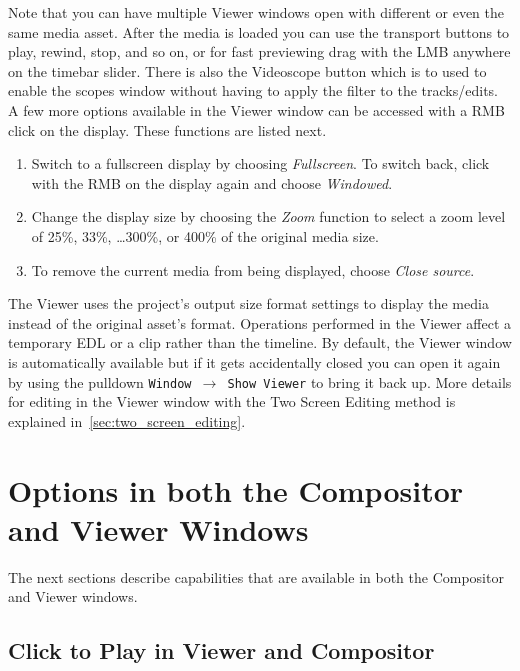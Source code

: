 Note that you can have multiple Viewer windows open with different or even the same media asset.
After the media is loaded you can use the transport buttons to play, rewind, stop, and so on, or
for fast previewing drag with the LMB anywhere on the timebar slider.  There is also the Videoscope
button which is to used to enable the scopes window without having to apply the filter to the tracks/edits.
A few more options available in the Viewer window can be accessed with a RMB click on the display.
These functions are listed next.

\begin{enumerate}
    \item  Switch to a fullscreen display by choosing \textit{Fullscreen}.  To switch back, click
with the RMB on the display again and choose \textit{Windowed}.
    \item  Change the display size by choosing the \textit{Zoom} function to select a zoom level of
25\%, 33\%, \ldots 300\%, or 400\% of the original media size.
    \item  To remove the current media from being displayed, choose \textit{Close source}.
\end{enumerate}

The Viewer uses the project's output size format settings to display the media instead of the
original asset's format. Operations performed in the Viewer affect a temporary EDL or a clip rather
than the timeline.  By default, the Viewer window is automatically available but if it gets
accidentally closed you can open it again by using the pulldown \texttt{Window $\rightarrow$ Show
Viewer} to bring it back up.  More details for editing in the Viewer window with the Two Screen
Editing method is explained in~\ref{sec:two_screen_editing}.

\section{Options in both the Compositor and Viewer Windows}%
\label{sec:options_in_both_the_compositor_and_viewer_windows}

The next sections describe capabilities that are available in both the Compositor and Viewer windows.

\subsection{Click to Play in Viewer and Compositor}%
\label{sub:click_to_play_in_viewer_and_compositor}

